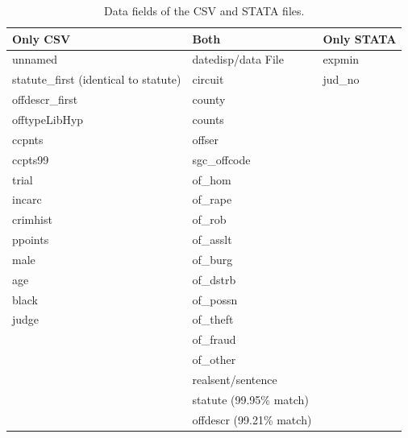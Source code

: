 \documentclass[11pt]{article}
\newcommand{\rowgroup}[1]{\hspace{-1em}#1}
\theoremstyle{ModifiedStyle}
\begin{document}
  	\begin{table}[H]
  		\centering
  		\vspace{2mm}
  		\caption{Data fields of the CSV and STATA files.}
  		\vspace{-2mm}
  		\setlength\tabcolsep{0pt} %
  		{\footnotesize
  			\begin{tabular}{C{50mm}C{50mm}C{50mm}}
  				\toprule
  				Only CSV & Both & Only STATA \\
  				\midrule
  				unnamed & datedisp/data File & expmin \\
  				statute\_first (identical to statute) & circuit & jud\_no \\
  				offdescr\_first & county &  \\
  				offtypeLibHyp & counts &  \\
  				ccpnts & offser &  \\
  				ccpts99 & sgc\_offcode &  \\
  				trial & of\_hom &  \\
  				incarc & of\_rape &  \\
  				crimhist & of\_rob &  \\
  				ppoints & of\_asslt &  \\
  				male & of\_burg &  \\
  				age & of\_dstrb &  \\
  				black & of\_possn &  \\
  				judge & of\_theft &  \\
  				& of\_fraud &  \\
  				& of\_other &  \\
  				& realsent/sentence &  \\
  				& statute (99.95\% match) &  \\
  				& offdescr (99.21\% match) &  \\
  				\bottomrule
  			\end{tabular}
  		}
  		\label{Table_Sentencing_Data_Fields}
  	\end{table}
\end{document}
